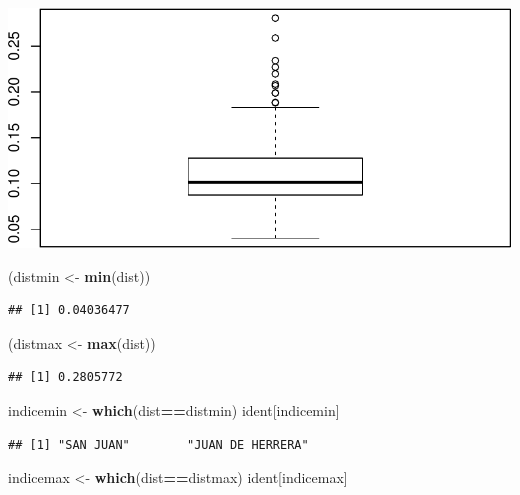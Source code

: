 \documentclass[11pt,]{article}
\newenvironment{Shaded}{\begin{snugshade}}{\end{snugshade}}
\newcommand{\KeywordTok}[1]{\textcolor[rgb]{0.13,0.29,0.53}{\textbf{#1}}}
\newcommand{\StringTok}[1]{\textcolor[rgb]{0.31,0.60,0.02}{#1}}
\newcommand{\OperatorTok}[1]{\textcolor[rgb]{0.81,0.36,0.00}{\textbf{#1}}}
\newcommand{\NormalTok}[1]{#1}
\begin{document}
\includegraphics{proyecto_files/figure-latex/unnamed-chunk-2-5.pdf}

\begin{Shaded}
\begin{Highlighting}[]
\NormalTok{(distmin <-}\StringTok{ }\KeywordTok{min}\NormalTok{(dist)) }
\end{Highlighting}
\end{Shaded}

\begin{verbatim}
## [1] 0.04036477
\end{verbatim}

\begin{Shaded}
\begin{Highlighting}[]
\NormalTok{(distmax <-}\StringTok{ }\KeywordTok{max}\NormalTok{(dist))}
\end{Highlighting}
\end{Shaded}

\begin{verbatim}
## [1] 0.2805772
\end{verbatim}

\begin{Shaded}
\begin{Highlighting}[]
\NormalTok{indicemin <-}\StringTok{ }\KeywordTok{which}\NormalTok{(dist}\OperatorTok{==}\NormalTok{distmin)}
\NormalTok{ident[indicemin]}
\end{Highlighting}
\end{Shaded}

\begin{verbatim}
## [1] "SAN JUAN"        "JUAN DE HERRERA"
\end{verbatim}

\begin{Shaded}
\begin{Highlighting}[]
\NormalTok{indicemax <-}\StringTok{ }\KeywordTok{which}\NormalTok{(dist}\OperatorTok{==}\NormalTok{distmax)}
\NormalTok{ident[indicemax]}
\end{Highlighting}
\end{Shaded}
\end{document}
